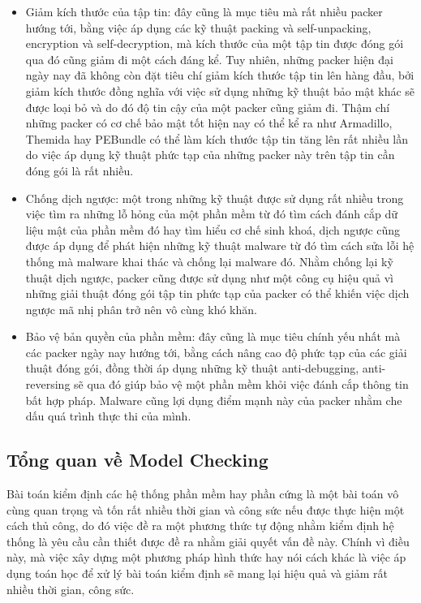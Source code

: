 \begin{itemize}
\item{Giảm kích thước của tập tin: đây cũng là mục tiêu mà rất nhiều packer hướng tới, bằng việc áp dụng các kỹ thuật packing và self-unpacking, encryption và self-decryption, mà kích thước của một tập tin được đóng gói qua đó cũng giảm đi một cách đáng kể. Tuy nhiên, những packer hiện đại ngày nay đã không còn đặt tiêu chí giảm kích thước tập tin lên hàng đầu, bởi giảm kích thước đồng nghĩa với việc sử dụng những kỹ thuật bảo mật khác sẽ được loại bỏ và do đó độ tin cậy của một packer cũng giảm đi. Thậm chí những packer có cơ chế bảo mật tốt hiện nay có thể kể ra như Armadillo, Themida hay PEBundle có thể làm kích thước tập tin tăng lên rất nhiều lần do việc áp dụng kỹ thuật phức tạp của những packer này trên tập tin cần đóng gói là rất nhiều.\\}
\item{Chống dịch ngược: một trong những kỹ thuật được sử dụng rất nhiều trong việc tìm ra những lỗ hỏng của một phần mềm từ đó tìm cách đánh cắp dữ liệu mật của phần mềm đó hay tìm hiểu cơ chế sinh khoá, dịch ngược cũng được áp dụng để phát hiện những kỹ thuật malware từ đó tìm cách sửa lỗi hệ thống mà malware khai thác và chống lại malware đó. Nhằm chống lại kỹ thuật dịch ngược, packer cũng được sử dụng như một công cụ hiệu quả vì những giải thuật đóng gói tập tin phức tạp của packer có thể khiến việc dịch ngược mã nhị phân trở nên vô cùng khó khăn.\\}
\item{Bảo vệ bản quyền của phần mềm: đây cũng là mục tiêu chính yếu nhất mà các packer ngày nay hướng tới, bằng cách nâng cao độ phức tạp của các giải thuật đóng gói, đồng thời áp dụng những kỹ thuật anti-debugging, anti-reversing sẽ qua đó giúp bảo vệ một phần mềm khỏi việc đánh cắp thông tin bất hợp pháp. Malware cũng lợi dụng điểm mạnh này của packer nhằm che dấu quá trình thực thi của mình.}
\end{itemize}

\subsection{Tổng quan về Model Checking}

\hspace{0.5cm}Bài toán kiểm định các hệ thống phần mềm hay phần cứng là một bài toán vô cùng quan trọng và tốn rất nhiều thời gian và công sức nếu được thực hiện một cách thủ công, do đó việc đề ra một phương thức tự động nhằm kiểm định hệ thống là yêu cầu cần thiết được đề ra nhằm giải quyết vấn đề này. Chính vì điều này, mà việc xây dựng một phương pháp hình thức hay nói cách khác là việc áp dụng toán học để xử lý bài toán kiểm định sẽ mang lại hiệu quả và giảm rất nhiều thời gian, công sức.\\

